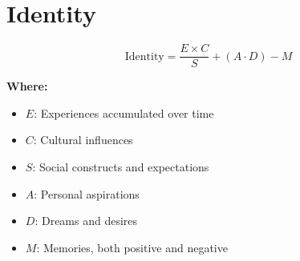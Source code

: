 \chapter{Identity}

\begin{equation}
\text{Identity} = \frac{E \times C}{S} + (A \cdot D) - M
\end{equation}

\textbf{Where:}

\begin{itemize}
    \item $E$: Experiences accumulated over time
    \item $C$: Cultural influences
    \item $S$: Social constructs and expectations
    \item $A$: Personal aspirations
    \item $D$: Dreams and desires
    \item $M$: Memories, both positive and negative
\end{itemize}